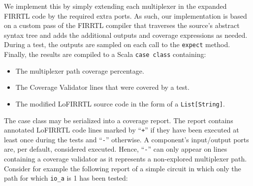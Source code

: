\documentclass[conference]{IEEEtran}
\begin{document}
We implement this by simply extending each multiplexer in the expanded FIRRTL code by the required extra ports. %
As such, our implementation is based on a custom pass of the FIRRTL compiler that traverses the source's abstract syntax tree and adds the additional outputs and coverage expressions as needed. During a test, the outputs are sampled on each call to the \texttt{expect} method. Finally, the results are compiled to a Scala \texttt{case class} containing:%
\begin{itemize}
\item The multiplexer path coverage percentage.
\item The Coverage Validator lines that were covered by a test.
\item The modified LoFIRRTL source code in the form of a \texttt{List[String]}.
\end{itemize}
The case class may be serialized into a coverage report. The report contains annotated LoFIRRTL code lines marked by ``\texttt{+}'' if they have been executed at least once during the tests and ``\texttt{-}'' otherwise. A component's input/output ports are, per default, considered executed. Hence, ``\texttt{-}'' can only appear on lines containing a coverage validator as it represents a non-explored multiplexer path. Consider for example the following report of a simple circuit in which only the path for which \texttt{io\_a} is 1 has been tested:
\end{document}
